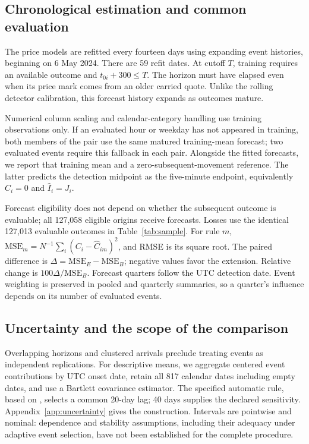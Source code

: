 \documentclass[12pt,letterpaper]{article}
\begin{document}
\subsection{Chronological estimation and common evaluation}
The price models are refitted every fourteen days using expanding event histories, beginning on 6 May 2024. There are 59 refit dates. At cutoff $T$, training requires an available outcome and $t_{0i}+300\le T$. The horizon must have elapsed even when its price mark comes from an older carried quote. Unlike the rolling detector calibration, this forecast history expands as outcomes mature.

Numerical column scaling and calendar-category handling use training observations only. If an evaluated hour or weekday has not appeared in training, both members of the pair use the same matured training-mean forecast; two evaluated events require this fallback in each pair. Alongside the fitted forecasts, we report that training mean and a zero-subsequent-movement reference. The latter predicts the detection midpoint as the five-minute endpoint, equivalently $\widehat C_i=0$ and $\widehat I_i=J_i$.

Forecast eligibility does not depend on whether the subsequent outcome is evaluable; all 127,058 eligible origins receive forecasts. Losses use the identical 127,013 evaluable outcomes in Table~\ref{tab:sample}. For rule $m$, $\mathrm{MSE}_m=N^{-1}\sum_i(C_i-\widehat C_{im})^2$, and RMSE is its square root. The paired difference is $\Delta=\mathrm{MSE}_E-\mathrm{MSE}_B$; negative values favor the extension. Relative change is $100\Delta/\mathrm{MSE}_B$. Forecast quarters follow the UTC detection date. Event weighting is preserved in pooled and quarterly summaries, so a quarter's influence depends on its number of evaluated events.

\subsection{Uncertainty and the scope of the comparison}
Overlapping horizons and clustered arrivals preclude treating events as independent replications. For descriptive means, we aggregate centered event contributions by UTC onset date, retain all 817 calendar dates including empty dates, and use a Bartlett covariance estimator. The specified automatic rule, based on \citet{newey1994automatic}, selects a common 20-day lag; 40 days supplies the declared sensitivity. Appendix~\ref{app:uncertainty} gives the construction. Intervals are pointwise and nominal: dependence and stability assumptions, including their adequacy under adaptive event selection, have not been established for the complete procedure.
\end{document}
